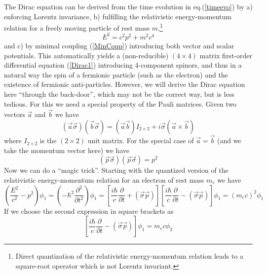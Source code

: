 \documentclass[12pt]{article}
\begin{document}
The Dirac equation can be derived from the time evolution in eq.(\ref{timeevo}) by a) enforcing Lorentz invariance, b) fulfilling the relativistic energy-momentum relation for a freely moving particle of rest mass $m$,\footnote{Direct quantization of the relativistic energy-momentum relation leads to a square-root operator which is not Lorentz invariant.}
\begin{equation}
   E^2 = c^2p^2 + m^2c^4
   \label{RelEnergy}
\end{equation}
and c) by minimal coupling (\ref{MinCoup}) introducing both vector and scalar potentials. This automatically yields a (non-reducible) $(4\times 4)$ matrix first-order differential equation (\ref{Dirac1}) introducing 4-component spinors, and thus in a natural way the spin of a fermionic particle (such as the electron) and the existence of fermionic anti-particles. However, we will derive the Dirac equation here ``through the back-door'', which may not be the correct way, but is less tedious. For this we need a special property of the Pauli matrices. Given two vectors $\vec{a}$ and $\vec{b}$ we have
\begin{equation}
   \left(\vec{a}\vec{\sigma} \right) \left(\vec{b}\vec{\sigma} \right) = \left(\vec{a}\vec{b} \right) I_{2\times 2} + i\vec{\sigma} \left(\vec{a}\times \vec{b} \right)
   \label{PropPauli}
\end{equation}
where $I_{2\times 2}$ is the $(2\times 2)$ unit matrix. For the special case of $\vec{a}=\vec{b}$ (and we take the momentum vector here) we have
\begin{equation}
   \left(\vec{p}\vec{\sigma} \right) \left(\vec{p}\vec{\sigma} \right) = p^2
   \label{PropPauli1}
\end{equation}
Now we can do a ``magic trick''. Starting with the quantized version of the relativistic energy-momentum relation for an electron of rest mass $m_e$ we have
\begin{equation}
   \left(\frac{E^2}{c^2}-p^2\right)\phi_1 = \left( -\hbar^2 \frac{\partial^2}{\partial t^2} \right)\phi_1 = \left[ \frac{i\hbar}{c} \frac{\partial}{\partial t} + \left(\vec{\sigma}\vec{p}\right) \right] \left[ \frac{i\hbar}{c} \frac{\partial}{\partial t} - \left(\vec{\sigma}\vec{p}\right) \right]\phi_1 = \left( m_ec\right)^2\phi_1
   \label{QuantEnerMom}
\end{equation}
If we choose the second expression in square brackets as
\begin{equation}
   \left[ \frac{i\hbar}{c} \frac{\partial}{\partial t} - \left(\vec{\sigma}\vec{p}\right) \right]\phi_1 = m_ec\phi_2
   \label{QuantEnerMom1}
\end{equation}
\end{document}
